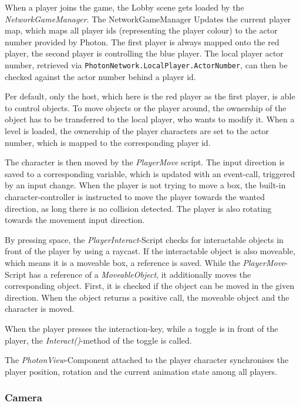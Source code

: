 When a player joins the game, the Lobby scene gets loaded by the \textit{NetworkGameManager}. The NetworkGameManager Updates the current player map, which maps all player ids (representing the player colour) to the actor number provided by Photon. The first player is always mapped onto the red player, the second player is controlling the blue player.
The local player actor number, retrieved via \texttt{PhotonNetwork.LocalPlayer.ActorNumber}, can then be checked against the actor number behind a player id.

Per default, only the host, which here is the red player as the first player, is able to control objects. To move objects or the player around, the ownership of the object has to be transferred to the local player, who wants to modify it.
When a level is loaded, the ownership of the player characters are set to the actor number, which is mapped to the corresponding player id.

The character is then moved by the \textit{PlayerMove} script.
The input direction is saved to a corresponding variable, which is updated with an event-call, triggered by an input change. When the player is not trying to move a box, the built-in character-controller is instructed to move the player towards the wanted direction, as long there is no collision detected.
The player is also rotating towards the movement input direction.

By pressing space, the \textit{PlayerInteract}-Script checks for interactable objects in front of the player by using a raycast. If the interactable object is also moveable, which means it is a moveable box, a reference is saved.
While the \textit{PlayerMove}-Script has a reference of a \textit{MoveableObject}, it additionally moves the corresponding object. First, it is checked if the object can be moved in the given direction. When the object returns a positive call, the moveable object and the character is moved.

When the player presses the interaction-key, while a toggle is in front of the player, the \textit{Interact()}-method of the toggle is called.

The \textit{PhotonView}-Component attached to the player character synchronises the player position, rotation and the current animation state among all players.


\subsubsection{Camera}

